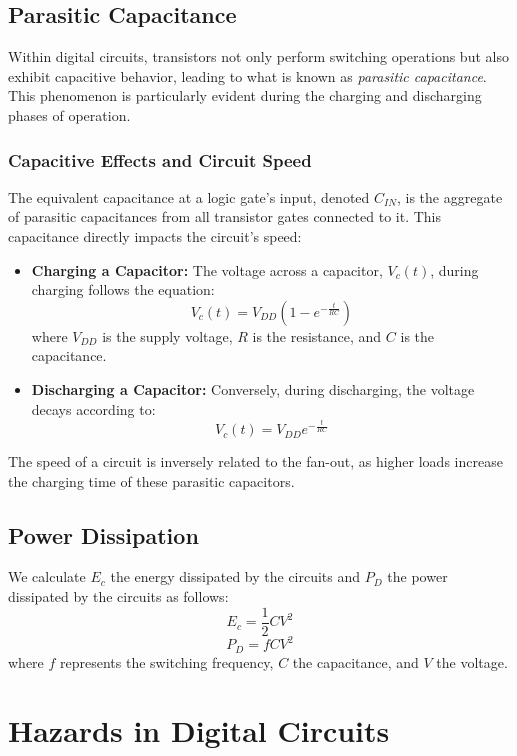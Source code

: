 \documentclass[12pt,openany, tikz,border=10pt]{book}
\begin{document}
\subsection{Parasitic Capacitance}

Within digital circuits, transistors not only perform switching operations but also exhibit capacitive behavior, leading to what is known as \textit{parasitic capacitance}. This phenomenon is particularly evident during the charging and discharging phases of operation.

\subsubsection{Capacitive Effects and Circuit Speed}

The equivalent capacitance at a logic gate's input, denoted $C_{IN}$, is the aggregate of parasitic capacitances from all transistor gates connected to it. This capacitance directly impacts the circuit's speed:
\begin{itemize}
    \item[] \textbf{Charging a Capacitor:} The voltage across a capacitor, $V_c(t)$, during charging follows the equation:
    \[ V_c(t) = V_{DD}(1 - e^{-\frac{t}{RC}}) \]
    where $V_{DD}$ is the supply voltage, $R$ is the resistance, and $C$ is the capacitance.
    
    \item[] \textbf{Discharging a Capacitor:} Conversely, during discharging, the voltage decays according to:
    \[ V_c(t) = V_{DD}e^{-\frac{t}{RC}} \]
\end{itemize}
The speed of a circuit is inversely related to the fan-out, as higher loads increase the charging time of these parasitic capacitors.

\subsection{Power Dissipation}

We calculate $E_c$ the energy dissipated by the circuits and $P_D$ the power dissipated by the circuits as follows:
\begin{equation}
E_c = \frac{1}{2}CV^2
\end{equation}
\begin{equation}
P_D = fCV^2
\end{equation}
where $f$ represents the switching frequency, $C$ the capacitance, and $V$ the voltage. 

\section{Hazards in Digital Circuits}
\end{document}
